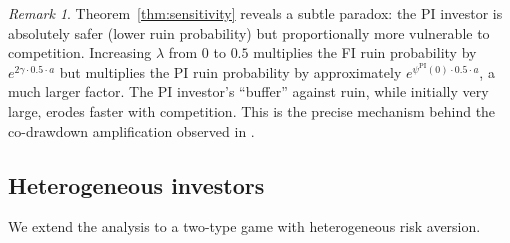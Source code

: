 \documentclass[12pt]{article}
\theoremstyle{remark}
\newtheorem{remark}[theorem]{Remark}
\theoremstyle{definition}
\newcommand{\PI}{\mathrm{PI}}
\begin{document}
\begin{remark}\label{rem:sensitivity_paradox}
Theorem~\ref{thm:sensitivity} reveals a subtle paradox:
the PI investor is absolutely safer (lower ruin probability) but
proportionally more vulnerable to competition.
Increasing $\lambda$ from $0$ to $0.5$ multiplies the FI ruin
probability by $e^{2\gamma \cdot 0.5 \cdot a}$ but multiplies the PI
ruin probability by approximately
$e^{\psi^{\PI}(0) \cdot 0.5 \cdot a}$, a much larger factor.
The PI investor's ``buffer'' against ruin, while initially very large,
erodes faster with competition.
This is the precise mechanism behind the co-drawdown amplification
observed in \citet[Figure~4]{HuangSun2025}.
\end{remark}

\subsection{Heterogeneous investors}
\label{sec:heterogeneous}

We extend the analysis to a two-type game with heterogeneous risk
aversion.
\end{document}
